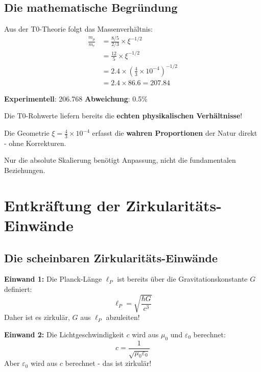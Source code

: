 	\subsection{Die mathematische Begründung}
	
	Aus der T0-Theorie folgt das Massenverhältnis:
	\begin{align}
		\frac{m_\mu}{m_e} &= \frac{8/5}{2/3} \times \xi^{-1/2} \\
		&= \frac{12}{5} \times \xi^{-1/2} \\
		&= 2.4 \times \left(\frac{4}{3} \times 10^{-4}\right)^{-1/2} \\
		&= 2.4 \times 86.6 = 207.84
	\end{align}
	
	\textbf{Experimentell}: 206.768 \quad \textbf{Abweichung}: 0.5\%
	
	\begin{tcolorbox}[colback=green!5!white,colframe=green!75!black,title=Revolutionäre Schlussfolgerung]
		Die T0-Rohwerte liefern bereits die \textbf{echten physikalischen Verhältnisse}!
		
		Die Geometrie $\xi = \frac{4}{3} \times 10^{-4}$ erfasst die \textbf{wahren Proportionen} der Natur direkt - ohne Korrekturen.
		
		Nur die absolute Skalierung benötigt Anpassung, nicht die fundamentalen Beziehungen.
	\end{tcolorbox}
	
	\section{Entkräftung der Zirkularitäts-Einwände}
	
	\subsection{Die scheinbaren Zirkularitäts-Einwände}
	
	\begin{tcolorbox}[colback=red!10!white,colframe=red!75!black,title=Häufige Kritikpunkte]
		\textbf{Einwand 1:} Die Planck-Länge $\ell_P$ ist bereits über die Gravitationskonstante $G$ definiert:
		\begin{equation}
			\ell_P = \sqrt{\frac{\hbar G}{c^3}}
		\end{equation}
		Daher ist es zirkulär, $G$ aus $\ell_P$ abzuleiten!
		
		\textbf{Einwand 2:} Die Lichtgeschwindigkeit $c$ wird aus $\mu_0$ und $\varepsilon_0$ berechnet:
		\begin{equation}
			c = \frac{1}{\sqrt{\mu_0 \varepsilon_0}}
		\end{equation}
		Aber $\varepsilon_0$ wird aus $c$ berechnet - das ist zirkulär!
	\end{tcolorbox}
	
